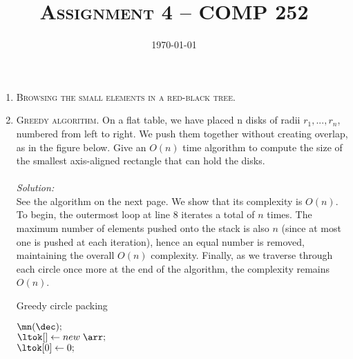 \documentclass[12pt]{article}
\title{\textsc{Assignment 4 -- COMP 252}}
\author{\it \nameone \nametwo}
\date{\today}
\theoremstyle{definition}
\theoremstyle{remark}
\newcommand\sol{%
  \\ 
  \\
  \textit{Solution:}\\%
}
\begin{document}
\maketitle 
\thispagestyle{empty} %
\begin{enumerate}
  \item \textsc{Browsing the small elements in a red-black tree}.
  \newpage 
  \item \textsc{Greedy algorithm}. On a flat table, we have placed n disks of radii $r_1, ..., r_n$, numbered from left to right. We push them together without creating overlap, as in the figure below. Give an $O(n)$ time algorithm to compute the size of the smallest axis-aligned rectangle that can hold the disks.
  \sol 
  See the algorithm on the next page. We show that its complexity is $O(n)$. To begin, the outermost loop at line 8 iterates a total of $n$ times. The maximum number of elements pushed onto the stack is also $n$ (since at most one is pushed at each iteration), hence an equal number is removed, maintaining the overall $O(n)$ complexity. Finally, as we traverse through each circle once more at the end of the algorithm, the complexity remains $O(n)$.
  \begin{algorithm}
    \caption{Greedy circle packing}

    \BlankLine

    \BlankLine

    \BlankLine 
    $\mn (\dec); $\\
    \BlankLine 
    $\ltok[] \gets new \; \arr;$\\     
    \BlankLine
    $\ltok[0] \gets 0;$\\ 


\end{algorithm}
\end{enumerate}
\end{document}

